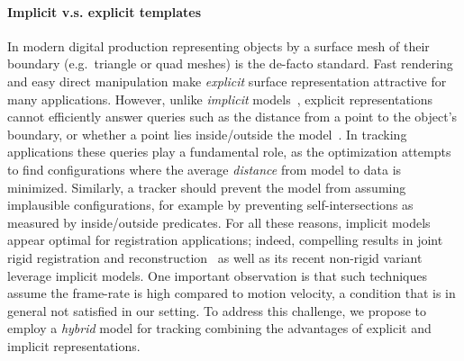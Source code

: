 
\paragraph{Implicit v.s. explicit templates}
In modern digital production representing objects by a surface mesh of their boundary (e.g.\ triangle or quad meshes) is the de-facto standard. Fast rendering and easy direct manipulation make \emph{explicit} surface representation attractive for many applications.
%
However, unlike \emph{implicit} models~\cite{bloomenthal1997book}, explicit representations cannot efficiently answer queries such as the distance from a point to the object's boundary, or whether a point lies inside/outside the model~\cite[Ch.1]{botsch2010book}. In tracking applications these queries play a fundamental role, as the optimization attempts to find configurations where the average \emph{distance} from model to data is minimized. Similarly, a tracker should prevent the model from assuming implausible configurations, for example by preventing self-intersections as measured by inside/outside predicates. For all these reasons, implicit models appear optimal for registration applications; indeed, compelling results in joint rigid registration and reconstruction~\cite{newcombe2011kinfu} as well as its recent non-rigid variant~\cite{newcombe2015dynfusion} leverage implicit models. One important observation is that such techniques assume the frame-rate is high compared to motion velocity, a condition that is in general not satisfied in our setting.  To address this challenge, we propose to employ a \emph{hybrid} model for tracking combining the advantages of explicit and implicit representations.


